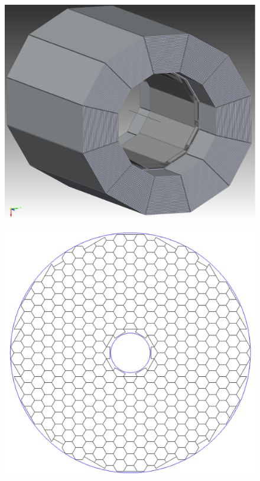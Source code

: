 \begin{figure}
\includegraphics[width=.5\linewidth]{Calorimeter/SiliconTungstenSiD/HCalECal} \hfill
\caption{}
\label{fig:Calorimeter:SiDECAL:HCalECal}
\end{figure}
\begin{figure}
\includegraphics[width=.5\linewidth]{Calorimeter/SiliconTungstenSiD/endcapLayout}
\caption{}
\label{fig:Calorimeter:SiDECAL:endcapLayout}
\end{figure}

